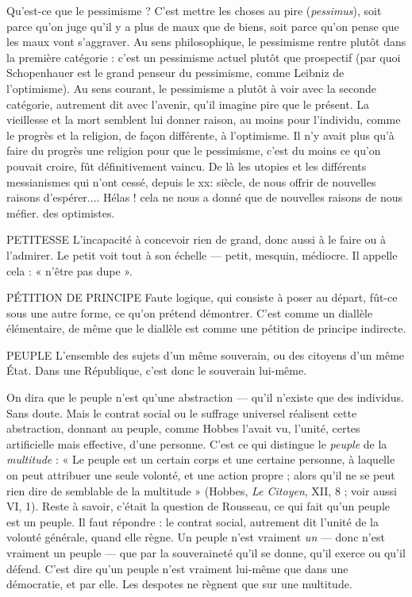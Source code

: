 Qu'est-ce que le pessimisme ? C’est mettre les choses au pire ({\it pessimus}), soit
parce qu’on juge qu’il y a plus de maux que de biens, soit parce qu'on pense
que les maux vont s’aggraver. Au sens philosophique, le pessimisme rentre
plutôt dans la première catégorie : c’est un pessimisme actuel plutôt que prospectif
(par quoi Schopenhauer est le grand penseur du pessimisme, comme
Leibniz de l’optimisme). Au sens courant, le pessimisme a plutôt à voir avec la
seconde catégorie, autrement dit avec l’avenir, qu’il imagine pire que le présent.
La vieillesse et la mort semblent lui donner raison, au moins pour l'individu,
comme le progrès et la religion, de façon différente, à l’optimisme. Il n’y avait
plus qu’à faire du progrès une religion pour que le pessimisme, c’est du moins
ce qu'on pouvait croire, fût définitivement vaincu. De là les utopies et les différents
messianismes qui n’ont cessé, depuis le xx: siècle, de nous offrir de
nouvelles raisons d’espérer.... Hélas ! cela ne nous a donné que de nouvelles raisons
de nous méfier. des optimistes.

PETITESSE  L’incapacité à concevoir rien de grand, donc aussi à le faire ou
à l’admirer. Le petit voit tout à son échelle — petit, mesquin,
médiocre. Il appelle cela : « n’être pas dupe ».

PÉTITION DE PRINCIPE Faute logique, qui consiste à poser au départ,
fût-ce sous une autre forme, ce qu’on prétend
démontrer. C’est comme un diallèle élémentaire, de même que le diallèle est
comme une pétition de principe indirecte.

PEUPLE L'ensemble des sujets d’un même souverain, ou des citoyens d’un
même État. Dans une République, c’est donc le souverain lui-même.

On dira que le peuple n’est qu’une abstraction — qu’il n’existe que des individus.
Sans doute. Mais le contrat social ou le suffrage universel réalisent cette
abstraction, donnant au peuple, comme Hobbes l'avait vu, l'unité, certes artificielle
mais effective, d’une personne. C’est ce qui distingue le {\it peuple} de la
{\it multitude} : « Le peuple est un certain corps et une certaine personne, à laquelle
on peut attribuer une seule volonté, et une action propre ; alors qu’il ne se peut
rien dire de semblable de la multitude » (Hobbes, {\it Le Citoyen}, XII, 8 ; voir aussi
VI, 1). Reste à savoir, c'était la question de Rousseau, ce qui fait qu’un peuple
est un peuple. Il faut répondre : le contrat social, autrement dit l’unité de la
volonté générale, quand elle règne. Un peuple n’est vraiment {\it un} — donc n’est
vraiment un peuple — que par la souveraineté qu’il se donne, qu’il exerce ou
qu’il défend. C’est dire qu’un peuple n’est vraiment lui-même que dans une
démocratie, et par elle. Les despotes ne règnent que sur une multitude.

